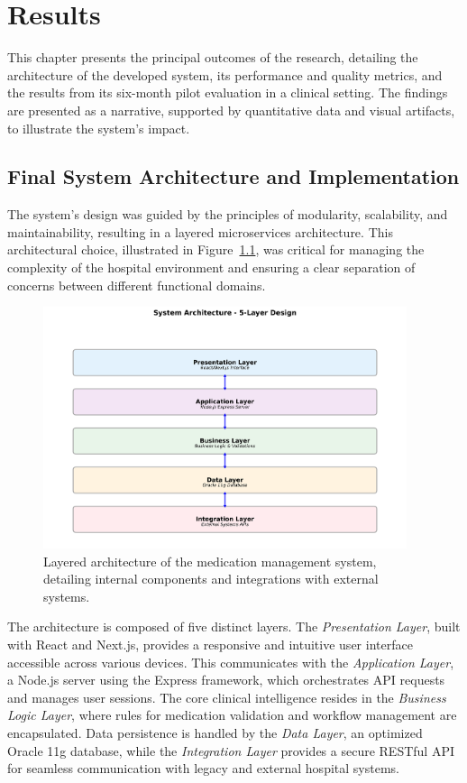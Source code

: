 \chapter{Results}

This chapter presents the principal outcomes of the research, detailing the architecture of the developed system, its performance and quality metrics, and the results from its six-month pilot evaluation in a clinical setting. The findings are presented as a narrative, supported by quantitative data and visual artifacts, to illustrate the system's impact.

\section{Final System Architecture and Implementation}

The system's design was guided by the principles of modularity, scalability, and maintainability, resulting in a layered microservices architecture. This architectural choice, illustrated in Figure~\ref{fig:architecture}, was critical for managing the complexity of the hospital environment and ensuring a clear separation of concerns between different functional domains.

\begin{figure}[htbp]
    \centering
    \includegraphics[width=0.95\textwidth]{images/generated/system_architecture.png}
    \caption{Layered architecture of the medication management system, detailing internal components and integrations with external systems.}
    \label{fig:architecture}
\end{figure}

The architecture is composed of five distinct layers. The \textit{Presentation Layer}, built with React and Next.js, provides a responsive and intuitive user interface accessible across various devices. This communicates with the \textit{Application Layer}, a Node.js server using the Express framework, which orchestrates API requests and manages user sessions. The core clinical intelligence resides in the \textit{Business Logic Layer}, where rules for medication validation and workflow management are encapsulated. Data persistence is handled by the \textit{Data Layer}, an optimized Oracle 11g database, while the \textit{Integration Layer} provides a secure RESTful API for seamless communication with legacy and external hospital systems.

